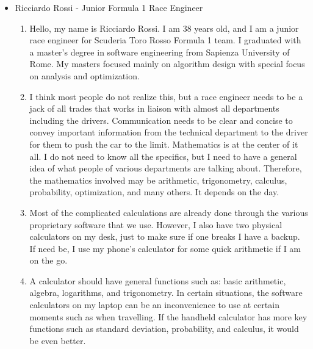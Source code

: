 \documentclass[titlepage]{article}
\begin{document}
\begin{itemize}
                    \item Ricciardo Rossi - Junior Formula 1 Race Engineer
                        \begin{enumerate}
                            \item Hello, my name is Ricciardo Rossi. I am 38 years old, and I am a junior race engineer for Scuderia Toro Rosso Formula 1 team. I graduated with a master’s degree in software engineering from Sapienza University of Rome. My masters focused mainly on algorithm design with special focus on analysis and optimization.
                            \item I think most people do not realize this, but a race engineer needs to be a jack of all trades that works in liaison with almost all departments including the drivers. Communication needs to be clear and concise to convey important information from the technical department to the driver for them to push the car to the limit. Mathematics is at the center of it all. I do not need to know all the specifics, but I need to have a general idea of what people of various departments are talking about. Therefore, the mathematics involved may be arithmetic, trigonometry, calculus, probability, optimization, and many others. It depends on the day.
                            \item Most of the complicated calculations are already done through the various proprietary software that we use. However, I also have two physical calculators on my desk, just to make sure if one breaks I have a backup. If need be, I use my phone’s calculator for some quick arithmetic if I am on the go.
                            \item A calculator should have general functions such as: basic arithmetic, algebra, logarithms, and trigonometry. In certain situations, the software calculators on my laptop can be an inconvenience to use at certain moments such as when travelling. If the handheld calculator has more key functions such as standard deviation, probability, and calculus, it would be even better.

\end{enumerate}
\end{itemize}
\end{document}
